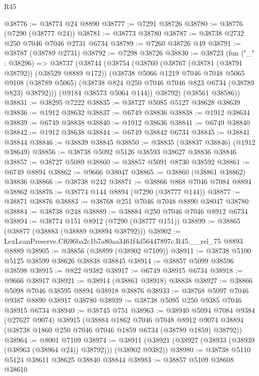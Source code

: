 \begin{lexlean}{R45}
\begin{coremodule}
{@38776 := @38774 @24 @8890
@38777 := @7291 @38726
@38780 := @38776 (@7290 (@38777 @24))
@38781 := @38773 @38780
@38787 := @38738 @2732 @250 @7046 @7046 @2731 @6734
@38789 := @7260 @38726 @49
@38791 := @38787 (@38789 @2731)
@38792 := @7298 @38726
@38830 := @38723
    (fun ("_" : @38296) =>
    @38737
      (@38744
        (@38754
          (@38760
            (@38767 (@38781 (@38791 @38792)) (@38529 @8889 @172))
            (@38738
              @5066
              @1219
              @7046
              @7048
              @5065
              @9108
              (@38789 @5065)
              (@38738 @824 @250 @7046 @7046 @823 @6734 (@38789 @823) @38792)))
          (@9184 @38573 @5064 @144))
        @38792)
      (@38561 @38586))
@38831 := @38295 @7222
@38835 := @38727 @5085 @5127 @38628 @38639
@38836 := @1912 @38632
@38837 := @6749 @38836
@38838 := @1912 @38634
@38839 := @6749 @38838
@38840 := @1912 @38636
@38841 := @6749 @38840
@38842 := @1912 @38638
@38844 := @6749 @38842 @6734
@38845 := @38841 @38844
@38846 := @38839 @38845
@38850 := @38835 (@38837 @38846) (@1912 @38649)
@38856 := @38738 @5092 @5126 @38593 @38627 @38836 @38846
@38857 := @38727 @5089
@38860 := @38857 @5091 @8730 @38592
@38861 := @6749 @8894
@38862 := @9666 @38047
@38865 := @38860 (@38861 @38862) @38836
@38866 := @38738 @242
@38871 := @38866 @868 @7046 @7084 @8894 @38862
@38876 := @38774 @144 @8894 (@7290 (@38777 @144))
@38877 := @38871 @38876
@38883 := @38768 @251 @7046 @7048 @8890 @38047 @38780
@38884 := @38738 @248
@38889 := @38884 @250 @7046 @7046 @8912 @6734
@38894 := @38774 @151 @8912 (@7290 (@38777 @151))
@38899 := @38865 (@38877 (@38883 (@38889 @38894 @38792)))
@38902 := LexLeanPreserve.Cf696ba2c1b7a80aa3461f4d56447897c.R45.__rel_75 @8893 @8889
@38905 := @38856 (@38899 (@38902 @7109))
@38911 := @38738 @5100 @5125 @38599 @38626 @38838 @38845
@38914 := @38857 @5099 @38596 @38598
@38915 := @822 @9382
@38917 := @6749 @38915 @6734
@38918 := @9666 @38917
@38921 := @38914 (@38861 @38918) @38838
@38927 := @38866 @5098 @7046 @38595 @8894 @38918 @38876
@38933 := @38768 @5097 @7046 @9387 @8890 @38917 @38780
@38939 := @38738 @5095 @250 @9385 @7046 @38915 @6734
@38940 := @38745 @751
@38963 := @38940
    @5094
    @7084
    @9384
    (@27627 @9074)
    @38915
    (@38884
      @1862
      @7046
      @7048
      @8912
      @9074
      @38894
      (@38738 @1860 @250 @7046 @7046 @1859 @6734 (@38789 @1859) @38792))
@38964 := @8001 @7109
@38974 := @38911 (@38921 (@38927 (@38933 (@38939 (@38963 (@38964 @24)) @38792))) (@38902 @9382))
@38980 := @38738 @5110 @5124 @38611 @38625 @38840 @38844
@38983 := @38857 @5109 @38608 @38610
}
\end{coremodule}
\end{lexlean}
